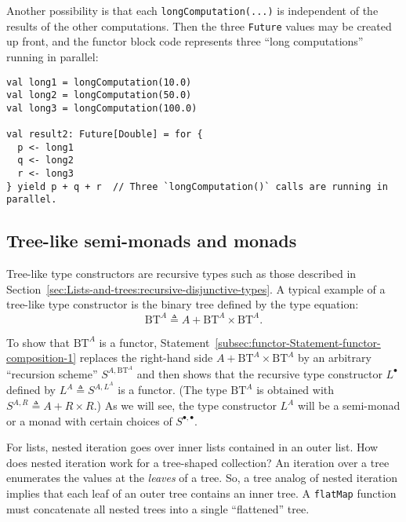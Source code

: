 Another possibility is that each \lstinline!longComputation(...)!
is independent of the results of the other computations. Then the
three \lstinline!Future! values may be created up front, and the
functor block code represents three \textsf{``}long computations\textsf{''} running
in parallel:
\begin{lstlisting}
val long1 = longComputation(10.0)
val long2 = longComputation(50.0)
val long3 = longComputation(100.0)

val result2: Future[Double] = for {
  p <- long1
  q <- long2
  r <- long3
} yield p + q + r  // Three `longComputation()` calls are running in parallel.
\end{lstlisting}


\subsection{Tree-like semi-monads and monads\label{subsec:Tree-like-semimonads-and-monads}}

Tree-like type constructors are recursive types such as those described
in Section~\ref{sec:Lists-and-trees:recursive-disjunctive-types}.
A typical example of a tree-like type constructor is the binary tree
defined by the type equation:
\[
\text{BT}^{A}\triangleq A+\text{BT}^{A}\times\text{BT}^{A}.
\]

To show that $\text{BT}^{A}$ is a functor, Statement~\ref{subsec:functor-Statement-functor-composition-1}
replaces the right-hand side $A+\text{BT}^{A}\times\text{BT}^{A}$
by an arbitrary \textsf{``}recursion scheme\textsf{''} $S^{A,\text{BT}^{A}}$
and then shows that the recursive type constructor $L^{\bullet}$
defined by $L^{A}\triangleq S^{A,L^{A}}$ is a functor. (The type
$\text{BT}^{A}$ is obtained with $S^{A,R}\triangleq A+R\times R$.)
As we will see, the type constructor $L^{A}$ will be a semi-monad
or a monad with certain choices of $S^{\bullet,\bullet}$.

For lists, nested iteration goes over inner lists contained in an
outer list. How does nested iteration work for a tree-shaped collection?
An iteration over a tree enumerates the values at the \emph{leaves}
of a tree. So, a tree analog of nested iteration implies that each
leaf of an outer tree contains an inner tree. A \lstinline!flatMap!
function must concatenate all nested trees into a single \textsf{``}flattened\textsf{''}
tree. 

